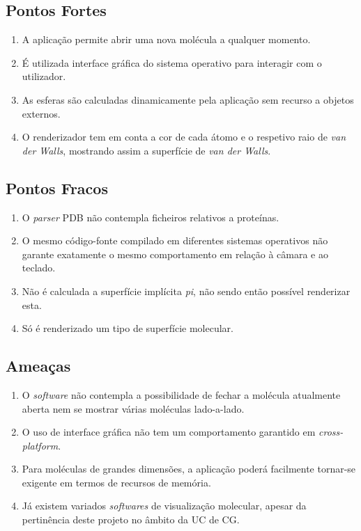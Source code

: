 \subsection{Pontos Fortes}
\label{ssec::reflexao:critica:fortes}

\begin{enumerate}[nosep]
	\item A aplicação permite abrir uma nova molécula a qualquer momento.
    \item É utilizada interface gráfica do sistema operativo para interagir com o utilizador.
    \item As esferas são calculadas dinamicamente pela aplicação sem recurso a objetos externos.
    \item O renderizador tem em conta a cor de cada átomo e o respetivo raio de \textit{van der Walls}, mostrando assim a superfície de \textit{van der Walls}.
\end{enumerate}


\subsection{Pontos Fracos}
\label{ssec::reflexao:critica:fracos}

\begin{enumerate}[nosep]
	\item O \textit{parser} \ac{PDB} não contempla ficheiros relativos a proteínas.
    \item O mesmo código-fonte compilado em diferentes sistemas operativos não garante exatamente o mesmo comportamento em relação à câmara e ao teclado.
    \item Não é calculada a superfície implícita \textit{pi}, não sendo então possível renderizar esta.
    \item Só é renderizado um tipo de superfície molecular.
\end{enumerate}


\subsection{Ameaças}
\label{ssec::reflexao:critica:ameacas}

\begin{enumerate}[nosep]
	\item O \textit{software} não contempla a possibilidade de fechar a molécula atualmente aberta nem se mostrar várias moléculas lado-a-lado.
    \item O uso de interface gráfica não tem um comportamento garantido em \textit{cross-platform}.
    \item Para moléculas de grandes dimensões, a aplicação poderá facilmente tornar-se exigente em termos de recursos de memória.
    \item Já existem variados \textit{softwares} de visualização molecular, apesar da pertinência deste projeto no âmbito da \ac{UC} de \ac{CG}.
\end{enumerate}


